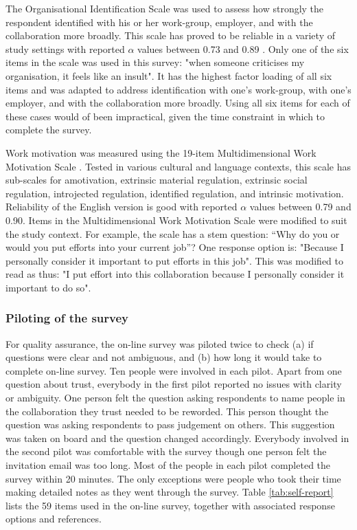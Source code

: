 The Organisational Identification Scale \citep{mael1992alumni} was used to assess how strongly the respondent identified with his or her work-group, employer, and with the collaboration more broadly. This scale has proved to be reliable in a variety of study settings with reported $\alpha$ values between 0.73 and 0.89 \citep{mael1992alumni,bergami2000self,knippenberg2000foci,van2008interactive}. Only one of the six items in the scale was used in this survey: "when someone criticises my organisation, it feels like an insult". It has the highest factor loading of all six items \citep{mael1992identifying} and was adapted to address identification with one's work-group, with one's employer, and with the collaboration more broadly. Using all six items for each of these cases would of been impractical, given the time constraint in which to complete the survey.\medskip

Work motivation was measured using the 19-item Multidimensional Work Motivation Scale \citep{gagne2015multidimensional}. Tested in various cultural and language contexts, this scale has sub-scales for amotivation, extrinsic material regulation, extrinsic social regulation, introjected regulation, identified regulation, and intrinsic motivation. Reliability of the English version is good with reported $\alpha$ values between 0.79 and 0.90. Items in the Multidimensional Work Motivation Scale were modified to suit the study context. For example, the scale has a stem question: “Why do you or would you put efforts into your current job”? One response option is: "Because I personally consider it important to put efforts in this job". This was modified to read as thus: "I put effort into this collaboration because I personally consider it important to do so". \medskip

\subsubsection{Piloting of the survey}

For quality assurance, the on-line survey was piloted twice to check (a) if questions were clear and not ambiguous, and (b) how long it would take to complete on-line survey. Ten people were involved in each pilot. Apart from one question about trust, everybody in the first pilot reported no issues with clarity or ambiguity. One person felt the question asking respondents to name people in the collaboration they trust needed to be reworded. This person thought the question was asking respondents to pass judgement on others. This suggestion was taken on board and the question changed accordingly. Everybody involved in the second pilot was comfortable with the survey though one person felt the invitation email was too long. Most of the people in each pilot completed the survey within 20 minutes. The only exceptions were people who took their time making detailed notes as they went through the survey. Table \ref{tab:self-report} lists the 59 items used in the on-line survey, together with associated response options and references.\medskip  


